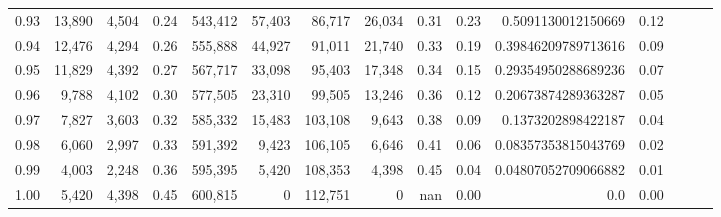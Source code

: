 \begin{tabular}{rrrrrrrrrrrrrrr}
0.93 &  13,890 &  4,504 &  0.24 &  543,412 &   57,403 &   86,717 &   26,034 &  0.31 &  0.23 &   0.5091130012150669 &      0.12 \\
0.94 &  12,476 &  4,294 &  0.26 &  555,888 &   44,927 &   91,011 &   21,740 &  0.33 &  0.19 &  0.39846209789713616 &      0.09 \\
0.95 &  11,829 &  4,392 &  0.27 &  567,717 &   33,098 &   95,403 &   17,348 &  0.34 &  0.15 &  0.29354950288689236 &      0.07 \\
0.96 &   9,788 &  4,102 &  0.30 &  577,505 &   23,310 &   99,505 &   13,246 &  0.36 &  0.12 &  0.20673874289363287 &      0.05 \\
0.97 &   7,827 &  3,603 &  0.32 &  585,332 &   15,483 &  103,108 &    9,643 &  0.38 &  0.09 &   0.1373202898422187 &      0.04 \\
0.98 &   6,060 &  2,997 &  0.33 &  591,392 &    9,423 &  106,105 &    6,646 &  0.41 &  0.06 &  0.08357353815043769 &      0.02 \\
0.99 &   4,003 &  2,248 &  0.36 &  595,395 &    5,420 &  108,353 &    4,398 &  0.45 &  0.04 &  0.04807052709066882 &      0.01 \\
1.00 &   5,420 &  4,398 &  0.45 &  600,815 &        0 &  112,751 &        0 &   nan &  0.00 &                  0.0 &      0.00 \\
\bottomrule
\end{tabular}
